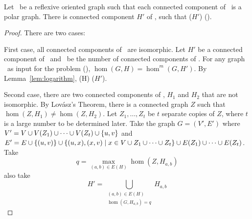 \begin{lemma} \label{lem:onecomp}
Let \mH\ be a reflexive oriented graph such that each connected component of \mH\ is a polar graph.
There is connected component \(H'\) of \mH, such that \chom(\(H'\)) \maple \chom(\mH)\@.
\end{lemma}

\begin{proof}
There are two cases:

First case, all connected components of \mH\ are isomorphic.
Let \(H'\) be a connected component of \mH\ and
\mm\ be the number of connected components of \mH\@.
For any graph \mG\ as input for the problem \chom(\mH), \(\hom(G,H)=\hom^m(G,H')\).
By Lemma~\ref{lem:logarithm}, \chom(H) \mapge \chom(\(H'\))\@.

Second case, there are two connected components of \mH, \(H_1\) and \(H_2\) that are not isomorphic.
By Lov\'{a}sz's Theorem, there is a connected graph \(Z\) such that \(\hom(Z,H_1) \neq \hom(Z,H_2)\)\@.
Let \(Z_1,\dotsc,Z_t\) be \(t\) separate copies of \(Z\), where \(t\) is a large number to be 
determined later.
Take the graph \(G=(V',E')\) where \(V'=V \cup V(Z_1)\cup \dotsb \cup V(Z_t) \cup \{{u,v}\} \)
and \(E'=E \cup \{{(u,v)}\} \cup \{{(u,x),(x,v) \mid x \in V \cup  Z_1 \cup \dotsb \cup Z_t}\} \cup
E(Z_1)\cup \dotsb \cup E(Z_t)\)\@. Take \[q= \max \limits_{(a,b) \in E(H)} \hom(Z,H_{a,b})\] also 
take \[H'=\bigcup_{\substack{(a,b)\in E(H) \\ 
\hom(G,H_{a,b})=q}} H_{a,b}\]


\end{proof}
